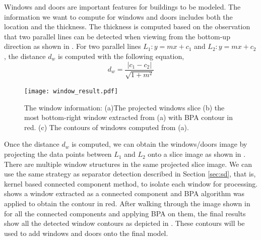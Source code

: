 Windows and doors are important features for buildings to be modeled. 
The information we want to compute for windows and doors includes both the location and the thickness.
The thickness is computed based on the observation that two parallel lines can be detected
when viewing from the bottom-up direction as shown in  . 
For two parallel lines $L_1: y = mx + c_1$ and $L_2: y = mx + c_2$, 
the distance $d_w$ is computed with the following equation,
\begin{equation*}
d_w = \frac{|c_1 - c_2|}{\sqrt{1 + m^2}}
\end{equation*}


\begin{figure}[htbp]
  \centering
  \texttt{[image: window\_result.pdf]}
      \caption{The window information: (a)The projected windows slice
      (b) the most bottom-right window extracted from (a) with BPA contour in red. 
	(c) The contours of windows computed from (a).}
      \label{fig:WD_Fig2}
\end{figure}

Once the distance $d_w$ is computed, we can obtain the windows/doors image by projecting the data points
between $L_1$ and $L_2$ onto a slice image as shown in . 
There are multiple window structures in the same projected slice image. 
We can use the same strategy as separator detection described in Section \ref{sec:sd}, that is,
kernel based connected component method, to isolate each window for processing. 
 shows a window extracted as a connected component and BPA algorithm was applied
to obtain the contour in red.
After walking through the image shown in  for all the connected components 
and applying BPA on them, 
the final results show all the detected window contours as depicted in .
These contours will be used to add windows and doors onto the final model.

